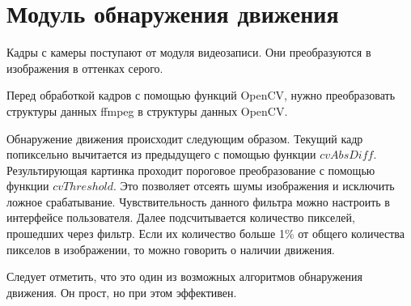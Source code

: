 \newpage

\section{Модуль обнаружения движения}
Кадры с камеры поступают от модуля видеозаписи.
Они преобразуются в изображения в оттенках серого.

Перед обработкой кадров с помощью функций OpenCV, нужно преобразовать структуры данных ffmpeg
в структуры данных OpenCV.

Обнаружение движения происходит следующим образом.
Текущий кадр попиксельно вычитается из предыдущего с помощью функции $cvAbsDiff$.
Результирующая картинка проходит пороговое преобразование с помощью функции $cvThreshold$.
Это позволяет отсеять шумы изображения и исключить ложное срабатывание.
Чувствительность данного фильтра можно настроить в интерфейсе пользователя.
Далее подсчитывается количество пикселей, прошедших через фильтр.
Если их количество больше 1\% от общего количества пикселов в изображении,
то можно говорить о наличии движения.

Следует отметить, что это один из возможных алгоритмов обнаружения движения.
Он прост, но при этом эффективен.

